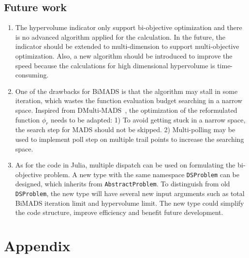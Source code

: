\documentclass[11pt,oneside,onecolumn,openright]{article}
\begin{document}
 \subsection{Future work}
\begin{enumerate}
  \item The hypervolume indicator only support bi-objective optimization and there is no advanced algorithm applied for the calculation. In the future, the indicator should be extended to multi-dimension to support multi-objective optimization. Also, a new algorithm should be introduced to improve the speed because the calculations for high dimensional hypervolume is time-consuming.
  \item One of the drawbacks for BiMADS is that the algorithm may stall in some iteration, which wastes the function evaluation budget searching in a narrow space. Inspired from DMulti-MADS~\cite{bigeon2021dmulti}, the optimization of the reformulated function $\phi_r$ needs to be adapted: 1) To avoid getting stuck in a narrow space, the search step for MADS should not be skipped. 2) Multi-polling may be used to implement poll step on multiple trail points to increase the searching space.
  \item As for the code in Julia, multiple dispatch can be used on formulating the bi-objective problem. A new type with the same namespace \verb|DSProblem| can be designed, which inherits from \verb|AbstractProblem|. To distinguish from old \verb|DSProblem|, the new type will have several new input arguments such as total BiMADS iteration limit and hypervolume limit. The new type could simplify the code structure, improve efficiency and benefit future development.
\end{enumerate}

\newpage
{\small
\begin{spacing}{1.0}


\end{spacing}
}

\newpage
\section{Appendix}
\end{document}
